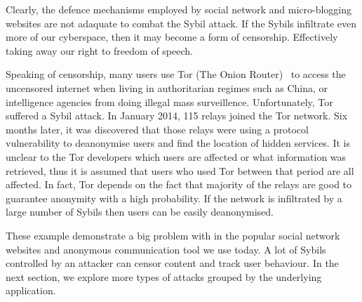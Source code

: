 Clearly, the defence mechanisms employed by social network and micro-blogging
websites are not adaquate to combat the Sybil attack. If the Sybils infiltrate
even more of our cyberspace, then it may become a form of censorship.
Effectively taking away our right to freedom of speech.

Speaking of censorship, many users use Tor (The Onion
Router)~\cite{dingledine2004tor} to access the uncensored internet when living
in authoritarian regimes such as China, or intelligence agencies from doing
illegal mass surveillence. Unfortunately, Tor suffered a Sybil attack. In
January 2014, 115 relays joined the Tor network. Six months later, it was
discovered that those relays were using a protocol vulnerability to deanonymise
users and find the location of hidden services. It is unclear to the Tor
developers which users are affected or what information was retrieved, thus it
is assumed that users who used Tor between that period are all
affected\cite{torsybil}. In fact, Tor depends on the fact that majority of the
relays are good to guarantee anonymity with a high probability. If the network
is infiltrated by a large number of Sybils then users can be easily
deanonymised.

These example demonstrate a big problem with in the popular social network
websites and anonymous communication tool we use today. A lot of Sybils
controlled by an attacker can censor content and track user behaviour. In the
next section, we explore more types of attacks grouped by the underlying
application.

